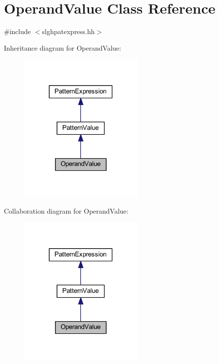 \hypertarget{class_operand_value}{}\section{Operand\+Value Class Reference}
\label{class_operand_value}


{\ttfamily \#include $<$slghpatexpress.\+hh$>$}



Inheritance diagram for Operand\+Value\+:
\nopagebreak
\begin{figure}[H]
\begin{center}
\leavevmode
\includegraphics[width=177pt]{class_operand_value__inherit__graph}
\end{center}
\end{figure}


Collaboration diagram for Operand\+Value\+:
\nopagebreak
\begin{figure}[H]
\begin{center}
\leavevmode
\includegraphics[width=177pt]{class_operand_value__coll__graph}
\end{center}
\end{figure}
